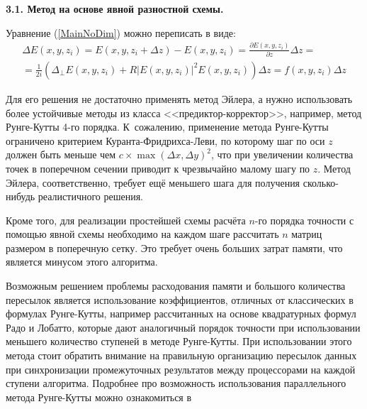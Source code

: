\vspace{1em}
\textbf{3.1. Метод на основе явной разностной схемы.}
\vspace{0.5em}

Уравнение (\ref{MainNoDim}) можно переписать в виде:
\begin{equation}
    \begin{aligned}
        \Delta E(x, y, z_i)=E(x, y, z_i+\Delta z)-E(x, y, z_i)=\frac{\partial E(x, y, z_i)}{\partial z}\Delta z = \\
        = \frac{1}{2i}(\Delta_{\perp}E(x, y, z_i) + R |E(x, y, z_i)|^2 E(x, y, z_i)) \Delta z = f(x, y, z_i)\Delta z
    \end{aligned}
\end{equation}

Для его решения не достаточно применять метод Эйлера, а нужно использовать более устойчивые методы из класса <<предиктор-корректор>>,
например, метод Рунге-Кутты 4-го порядка. К~сожалению, применение метода Рунге-Кутты ограничено
критерием Куранта-Фридрихса-Леви, по которому шаг по оси $z$ должен быть меньше чем $c \times \max(\Delta x,\Delta y)^{2}$,
что при увеличении количества точек в поперечном сечении приводит к чрезвычайно малому шагу по $z$.
Метод Эйлера, соответственно, требует ещё меньшего шага для получения сколько-нибудь реалистичного решения.

Кроме того, для реализации простейшей схемы расчёта $n$-го порядка точности с помощью явной схемы
необходимо на каждом шаге рассчитать $n$ матриц размером в поперечную сетку.
Это требует очень больших затрат памяти, что является минусом этого алгоритма.

Возможным решением проблемы расходования памяти и большого количества пересылок является использование коэффициентов, отличных от классических в формулах Рунге-Кутты,
например рассчитанных на основе квадратурных формул Радо и Лобатто\cite{RK_Rado_Lobatto},
которые дают аналогичный порядок точности при использовании меньшего количество ступеней в методе Рунге-Кутты.
При использовании этого метода стоит обратить внимание на правильную организацию пересылок данных
при синхронизации промежуточных результатов между процессорами на каждой ступени алгоритма.
Подробнее про возможность использования параллельного метода Рунге-Кутты можно ознакомиться в \cite{RK_Parallel_Houwen_2001, RK_Parallel_Jackson_2001}
